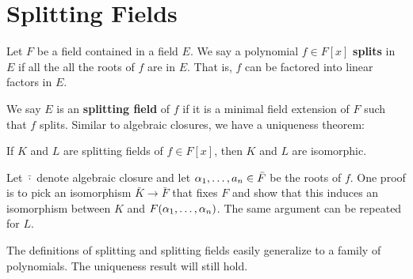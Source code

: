 \section{Splitting Fields}
Let $F$ be a field contained in a field $E$. We say a polynomial $f \in F[x]$ \textbf{splits} in $E$ if all the all the roots of $f$ are in $E$. That is, $f$ can be factored into linear factors in $E$.

We say $E$ is an \textbf{splitting field} of $f$ if it is a minimal field extension of $F$ such that $f$ splits. Similar to algebraic closures, we have a uniqueness theorem:
\begin{center}
    If $K$ and $L$ are splitting fields of $f \in F[x]$, then $K$ and $L$ are isomorphic.
\end{center}
Let $\bar{\cdot}$ denote algebraic closure and let $\alpha_1, \dots, a_n \in \bar{F}$ be the roots of $f$. One proof is to pick an isomorphism $\bar{K} \to \bar{F}$ that fixes $F$ and show that this induces an isomorphism between $K$ and $F(\alpha_1, \dots, \alpha_n)$. The same argument can be repeated for $L$.

The definitions of splitting and splitting fields easily generalize to a family of polynomials. The uniqueness result will still hold.
